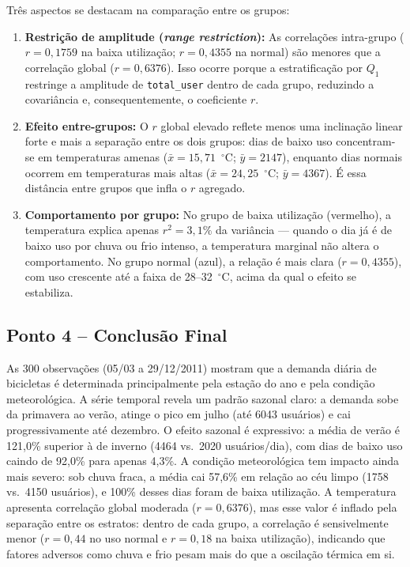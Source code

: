 \documentclass[10pt, a4paper]{article}
\begin{document}
Três aspectos se destacam na comparação entre os grupos:

\begin{enumerate}[label=\alph*)]
    \item \textbf{Restrição de amplitude (\textit{range restriction}):} As correlações intra-grupo ($r = 0{,}1759$ na baixa utilização; $r = 0{,}4355$ na normal) são menores que a correlação global ($r = 0{,}6376$). Isso ocorre porque a estratificação por $Q_1$ restringe a amplitude de \texttt{total\_user} dentro de cada grupo, reduzindo a covariância e, consequentemente, o coeficiente $r$.
    
    \item \textbf{Efeito entre-grupos:} O $r$ global elevado reflete menos uma inclinação linear forte e mais a separação entre os dois grupos: dias de baixo uso concentram-se em temperaturas amenas ($\bar{x} = 15{,}71$~$^\circ$C; $\bar{y} = 2147$), enquanto dias normais ocorrem em temperaturas mais altas ($\bar{x} = 24{,}25$~$^\circ$C; $\bar{y} = 4367$). É essa distância entre grupos que infla o $r$ agregado.
    
    \item \textbf{Comportamento por grupo:} No grupo de baixa utilização (vermelho), a temperatura explica apenas $r^2 = 3{,}1\%$ da variância — quando o dia já é de baixo uso por chuva ou frio intenso, a temperatura marginal não altera o comportamento. No grupo normal (azul), a relação é mais clara ($r = 0{,}4355$), com uso crescente até a faixa de 28--32~$^\circ$C, acima da qual o efeito se estabiliza.
\end{enumerate}

\clearpage
\subsection{Ponto 4 -- Conclusão Final}

As 300 observações (05/03 a 29/12/2011) mostram que a demanda diária de bicicletas é determinada principalmente pela estação do ano e pela condição meteorológica. A série temporal revela um padrão sazonal claro: a demanda sobe da primavera ao verão, atinge o pico em julho (até 6043 usuários) e cai progressivamente até dezembro. O efeito sazonal é expressivo: a média de verão é 121,0\% superior à de inverno (4464 vs.\ 2020 usuários/dia), com dias de baixo uso caindo de 92,0\% para apenas 4,3\%. A condição meteorológica tem impacto ainda mais severo: sob chuva fraca, a média cai 57,6\% em relação ao céu limpo (1758 vs.\ 4150 usuários), e 100\% desses dias foram de baixa utilização. A temperatura apresenta correlação global moderada ($r = 0{,}6376$), mas esse valor é inflado pela separação entre os estratos: dentro de cada grupo, a correlação é sensivelmente menor ($r = 0{,}44$ no uso normal e $r = 0{,}18$ na baixa utilização), indicando que fatores adversos como chuva e frio pesam mais do que a oscilação térmica em si.
\end{document}
